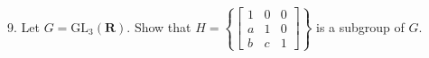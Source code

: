 \newpage
\begin{mdframed}[style=darkQuesion]
9. Let $G=\mathrm{GL}_{3}(\mathbf{R}) .$ Show that $H=\left\{\left[\begin{array}{lll}1 & 0 & 0 \\ a & 1 & 0 \\ b & c & 1\end{array}\right]\right\}$ is a subgroup of $G .$

\end{mdframed}

